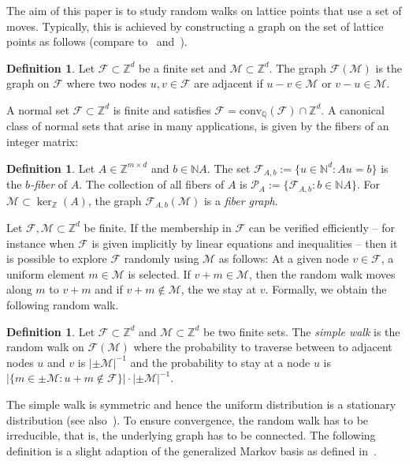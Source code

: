 \documentclass[11pt]{amsart}
\theoremstyle{definition}
\newtheorem{defn}[thm]{Definition}
\numberwithin{equation}{section}
\newcommand{\ring}[1]{\ensuremath{\mathbb{#1}}}
\renewcommand{\>}{\rangle}
\newcommand{\<}{\langle}
\newcommand{\0}{\mathbf{0}}
\newcommand{\1}{\mathbf{1}}
\newcommand{\2}{\mathbf{2}}
\newcommand\NN{\ring{N}}
\newcommand\QQ{\ring{Q}}
\newcommand\ZZ{\ring{Z}}
\newcommand\cF{{\mathcal F}}
\newcommand\cM{{\mathcal M}}
\newcommand\cP{{\mathcal P}}
\newcommand{\fiber}[2]{\mathcal{F}_{#1,#2}}
\newcommand{\fibergraph}[3]{\mathcal{F}_{#1,#2}\left(#3\right)}
\newcommand{\conv}[1]{\mathrm{conv}_\QQ(#1)}
\newcommand\cone[1]{\NN#1}
\begin{document}
The aim of this paper is to study random walks on lattice points that
use a set of moves. Typically, this is achieved by constructing a
graph on the set of lattice points as follows (compare
to~\cite[Section~1.3]{drton2008} and~\cite[Chapter~5]{Sturmfels1996}).

\begin{defn}\label{d:FiberGraphs}
Let $\cF\subset\ZZ^d$ be a finite set and $\cM\subset\ZZ^d$. The graph
$\cF(\cM)$ is the graph on $\cF$ where two nodes $u,v\in\cF$ are adjacent
if $u-v\in\cM$ or $v-u\in\cM$. 
\end{defn}

A normal set $\cF\subset\ZZ^d$ is finite and satisfies
$\cF=\conv{\cF}\cap\ZZ^d$. A canonical class of normal sets that arise
in many applications, is given by the fibers of an integer matrix:

\begin{defn}\label{d:Fibers}
Let $A\in\ZZ^{m\times d}$ and $b\in\cone{A}$. The set
$\fiber{A}{b}:=\{u\in\NN^d: Au=b\}$ is the \emph{$b$-fiber} of $A$.
The collection of all fibers of $A$ is $\cP_A:=\{\fiber{A}{b}:
b\in\NN A\}$. For $\cM\subset\ker_\ZZ(A)$, the graph
$\fibergraph{A}{b}{\cM}$ is a \emph{fiber graph}.
\end{defn}

Let $\cF,\cM\subset\ZZ^d$ be finite. If the membership in $\cF$ can be
verified efficiently  -- for instance when $\cF$ is given implicitly by
linear equations and inequalities -- then it is possible to explore
$\cF$ randomly using $\cM$ as follows: At a given node $v\in\cF$, a
uniform element $m\in\cM$ is selected. If $v+m\in\cM$, then the random
walk moves along $m$ to $v+m$ and if $v+m\not\in\cM$, the we stay at
$v$. Formally, we obtain the following random walk.

\begin{defn}\label{d:SimpleFiberWalk}
Let $\cF\subset\ZZ^d$ and $\cM\subset\ZZ^d$ be two finite sets. The
\emph{simple walk} is the random walk on $\cF(\cM)$ where the
probability to traverse between to adjacent nodes $u$ and $v$ is
$|\pm\cM|^{-1}$ and the probability to stay at a node $u$ is 
$|\{m\in\pm\cM: u+m\not\in\cF\}|\cdot|\pm\cM|^{-1}$.
\end{defn}

The simple walk is symmetric and hence the uniform distribution is a
stationary distribution (see also~\cite[Section~2]{windisch2015-mixing}). To
ensure convergence, the random walk has to be irreducible, that is,
the underlying graph has to be connected. The following definition is
a slight adaption of the generalized Markov basis as defined
in~\cite[Definition~1]{Rauh2014}.
\end{document}
